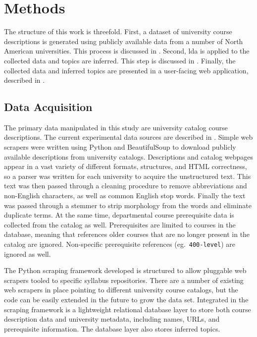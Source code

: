 \section{Methods}
\label{sec:methods}


The structure of this work is threefold.
First, a dataset of university course descriptions is generated using publicly available data from a number of North American universities.
This process is discussed in .
Second, \ac{lda} is applied to the collected data and topics are inferred.
This step is discussed in .
Finally, the collected data and inferred topics are presented in a user-facing web application, described in .


\subsection{Data Acquisition}
\label{sec:data-acquisition}


The primary data manipulated in this study are university catalog course descriptions.
The current experimental data sources are described in .
Simple web scrapers were written using Python and BeautifulSoup to download publicly available descriptions from university catalogs.
Descriptions and catalog webpages appear in a vast variety of different formats, structures, and HTML correctness, so a parser was written for each university to acquire the unstructured text.
This text was then passed through a cleaning procedure to remove abbreviations and non-English characters, as well as common English stop words.
Finally the text was passed through a stemmer to strip morphology from the words and eliminate duplicate terms.
At the same time, departmental course prerequisite data is collected from the catalog as well.
Prerequisites are limited to courses in the database, meaning that references older courses that are no longer present in the catalog are ignored.
Non-specific prerequisite references (eg.\ \texttt{400-level}) are ignored as well.


The Python scraping framework developed is structured to allow pluggable web scrapers tooled to specific syllabus repositories.
There are a number of existing web scrapers in place pointing to different university course catalogs, but the code can be easily extended in the future to grow the data set.
Integrated in the scraping framework is a lightweight relational database layer to store both course description data and university metadata, including names, URLs, and prerequisite information.
The database layer also stores inferred topics.

